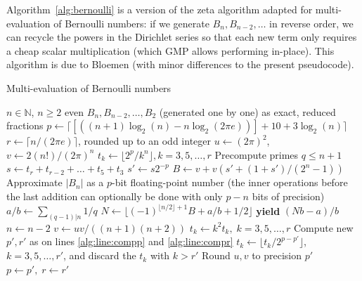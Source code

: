 \documentclass[reqno]{amsart}
\newcommand{\NN}{\mathbb{N}}
\theoremstyle{definition}
\begin{document}
Algorithm~\ref{alg:bernoulli} is a version of the
zeta algorithm adapted for multi-evaluation of Bernoulli numbers:
if we generate $B_n, B_{n-2}, \ldots$ in reverse order,
we can recycle the powers in the Dirichlet series
so that each new term only requires a cheap scalar multiplication (which GMP allows performing in-place).
This algorithm is due to Bloemen \cite{Bloemen2009} (with minor differences
to the present pseudocode).

\begin{algorithm}%
\caption{Multi-evaluation of Bernoulli numbers}\label{alg:bernoulli}
\small
\begin{algorithmic}[1]
\Require $n \in \NN$, $n \ge 2$ even
\Ensure $B_n, B_{n-2}, \ldots, B_2$  (generated one by one) as exact, reduced fractions
\State $p \gets \lceil [((n+1) \log_2(n) - n \log_2(2 \pi e))] + 10 + 3 \log_2(n) \rceil$ \label{alg:line:compp}
\State $r \gets \lceil n / (2 \pi e) \rceil$, rounded up to an odd integer   \label{alg:line:compr}
\State $u \gets (2 \pi)^2$, $v \gets 2 (n!) / (2\pi)^n$ 
\State $t_k \gets \lfloor 2^p / k^n \rfloor, k = 3, 5, \ldots, r$ 
\State Precompute primes $q \le n + 1$
  \State $s \gets t_r + t_{r-2} + \ldots + t_5 + t_3$ 
  \State $s' \gets s 2^{-p}$ 
  \State $B \gets  v + v (s' + (1 + s') / (2^n - 1))$ \Comment Approximate $|B_n|$ as a $p$-bit floating-point number (the inner operations before the last addition can optionally be done with only $p - n$ bits of precision)
  \State $a/b \gets \sum_{(q-1)|n} 1/q$ 
  \State $N \gets \lfloor (-1)^{\lfloor n / 2 \rfloor + 1} B + a/b + 1/2 \rfloor$ 
  \State \textbf{yield} $(N b - a) / b$ 
  \State $n \gets n - 2$
  \State $v \gets u v / ((n+1)(n+2))$
  \State $t_k \gets k^2 t_k, \; k = 3, 5, \ldots, r$ 
   
    \State Compute new $p', r'$ as on lines \ref{alg:line:compp} and \ref{alg:line:compr}
    \State $t_k \gets \lfloor t_k / 2^{p - p'} \rfloor$, $k = 3, 5, \ldots, r'$, and discard the $t_k$ with $k > r'$
    \State Round $u, v$ to precision $p'$
    \State $p \gets p', \; r \gets r'$
  \EndIf
\EndWhile
\end{algorithmic}
\end{algorithm}
\end{document}
